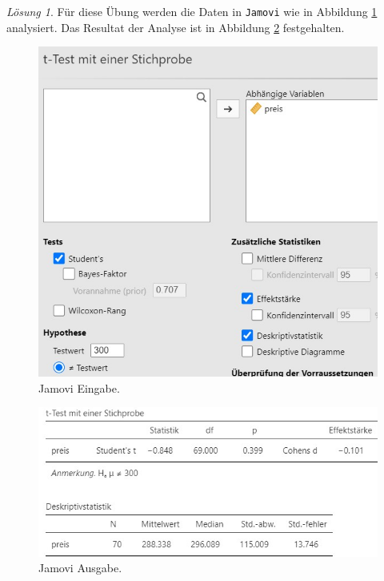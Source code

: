\documentclass[
]{book}
\theoremstyle{definition}
\theoremstyle{definition}
\theoremstyle{definition}
\theoremstyle{definition}
\theoremstyle{remark}
\newtheorem*{solution}{Lösung}
\begin{document}
\begin{solution}

Für diese Übung werden die Daten in \texttt{Jamovi} wie in Abbildung \ref{fig:sol-marktpreisanalyse-testen-input} analysiert. Das Resultat der Analyse ist in Abbildung \ref{fig:sol-marktpreisanalyse-testen-output} festgehalten.

\begin{figure}
\includegraphics[width=1\linewidth]{figures/05-exr-marktpreisanalyse-testen-jmv-input} \caption{Jamovi Eingabe.}\label{fig:sol-marktpreisanalyse-testen-input}
\end{figure}

\begin{figure}
\includegraphics[width=1\linewidth]{figures/05-exr-marktpreisanalyse-testen-jmv-output} \caption{Jamovi Ausgabe.}\label{fig:sol-marktpreisanalyse-testen-output}
\end{figure}


\end{solution}
\end{document}
